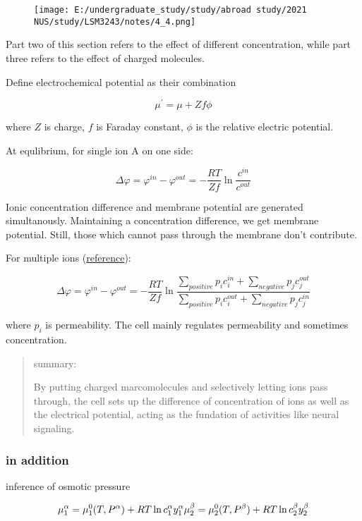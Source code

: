 \documentclass[]{article}
\begin{document}
\begin{figure}
\centering
\texttt{[image: E:/undergraduate\_study/study/abroad study/2021 NUS/study/LSM3243/notes/4\_4.png]}
\caption{}
\end{figure}

Part two of this section refers to the effect of different
concentration, while part three refers to the effect of charged
molecules.

Define electrochemical potential as their combination

\[\mu^\prime=\mu+Zf\phi\]

where \(Z\) is charge, \(f\) is Faraday constant, \(\phi\) is the
relative electric potential.

At equlibrium, for single ion A on one side:

\[\Delta\varphi=\varphi^{in}-\varphi^{out}=-\dfrac{RT}{Zf}\ln\dfrac{c^{in}}{c^{out}}\]

Ionic concentration difference and membrane potential are generated
simultanously. Maintaining a concentration difference, we get membrane
potential. Still, those which cannot pass through the membrane don't
contribute.

For multiple ions
(\href{https://en.wikipedia.org/wiki/Goldman_equation}{reference}):

\[\Delta\varphi=\varphi^{in}-\varphi^{out}=-\dfrac{RT}{Zf}\ln\dfrac{\sum\limits_{positive} p_ic_{i}^{in}+\sum\limits_{negative} p_jc_{j}^{out}}{\sum\limits_{positive} p_ic_{i}^{out}+\sum\limits_{negative} p_jc_{j}^{in}}\]

where \(p_i\) is permeability. The cell mainly regulates permeability
and sometimes concentration.

\begin{quote}
summary:

By putting charged marcomolecules and selectively letting ions pass
through, the cell sets up the difference of concentration of ions as
well as the electrical potential, acting as the fundation of activities
like neural signaling.
\end{quote}

\hypertarget{in-addition-2}{%
\subsubsection{in addition}\label{in-addition-2}}

inference of osmotic pressure

\[\mu_1^\alpha=\mu_1^0(T,P^\alpha)+RT\ln c_1^\alpha y_1^\alpha\\
\mu_2^\beta=\mu_2^0(T,P^\beta)+RT\ln c_2^\beta y_2^\beta\]
\end{document}

